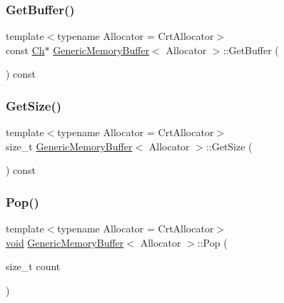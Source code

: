 \subsubsection{\texorpdfstring{Get\+Buffer()}{GetBuffer()}}
{\footnotesize\ttfamily template$<$typename Allocator  = Crt\+Allocator$>$ \\
const \hyperlink{structGenericMemoryBuffer_a212f137abfd8bce2ad216b2d960c027f}{Ch}$\ast$ \hyperlink{structGenericMemoryBuffer}{Generic\+Memory\+Buffer}$<$ Allocator $>$\+::Get\+Buffer (\begin{DoxyParamCaption}{ }\end{DoxyParamCaption}) const\hspace{0.3cm}{\ttfamily [inline]}}

\mbox{\label{structGenericMemoryBuffer_aaab1f18d03109ab01213d3e3d8368ff9}} 
\subsubsection{\texorpdfstring{Get\+Size()}{GetSize()}}
{\footnotesize\ttfamily template$<$typename Allocator  = Crt\+Allocator$>$ \\
size\+\_\+t \hyperlink{structGenericMemoryBuffer}{Generic\+Memory\+Buffer}$<$ Allocator $>$\+::Get\+Size (\begin{DoxyParamCaption}{ }\end{DoxyParamCaption}) const\hspace{0.3cm}{\ttfamily [inline]}}

\mbox{\label{structGenericMemoryBuffer_a82a6706286f1356e1769282f5d496005}} 
\subsubsection{\texorpdfstring{Pop()}{Pop()}}
{\footnotesize\ttfamily template$<$typename Allocator  = Crt\+Allocator$>$ \\
\hyperlink{imgui__impl__opengl3__loader_8h_ac668e7cffd9e2e9cfee428b9b2f34fa7}{void} \hyperlink{structGenericMemoryBuffer}{Generic\+Memory\+Buffer}$<$ Allocator $>$\+::Pop (\begin{DoxyParamCaption}\item[{size\+\_\+t}]{count }\end{DoxyParamCaption})\hspace{0.3cm}{\ttfamily [inline]}}

